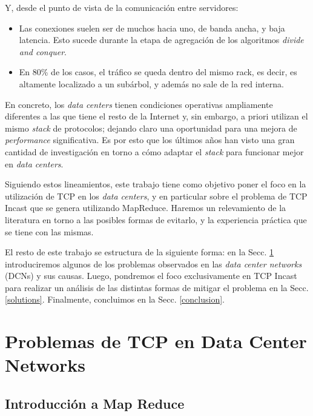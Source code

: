 \documentclass[runningheads,a4paper]{llncs}
\begin{document}
Y, desde el punto de vista de la comunicación entre servidores:

\begin{itemize}
    \item Las conexiones suelen ser de muchos hacia uno, de banda ancha, y baja latencia. Esto sucede durante la etapa de agregación de los algoritmos \textit{divide and conquer}.
    
    \item En 80\% de los casos, el tráfico se queda dentro del mismo rack, es decir, es altamente localizado a un subárbol, y además no sale de la red interna.
\end{itemize}

En concreto, los \textit{data centers} tienen condiciones operativas ampliamente diferentes a las que tiene el resto de la Internet y, sin embargo, a priori utilizan el mismo \textit{stack} de protocolos; dejando claro una oportunidad para una mejora de \textit{performance} significativa. Es por esto que los últimos años han visto una gran cantidad de investigación en torno a cómo adaptar el \textit{stack} para funcionar mejor en \textit{data centers}.

Siguiendo estos lineamientos, este trabajo tiene como objetivo poner el foco en la utilización de TCP en los \textit{data centers}, y en particular sobre el problema de TCP Incast que se genera utilizando MapReduce. Haremos un relevamiento de la literatura en torno a las posibles formas de evitarlo, y la experiencia práctica que se tiene con las mismas.

El resto de este trabajo se estructura de la siguiente forma: en la Secc. \ref{problems} introduciremos algunos de los problemas observados en las \textit{data center networks} (DCNs) y sus causas. Luego, pondremos el foco exclusivamente en TCP Incast para realizar un análisis de las distintas formas de mitigar el problema en la Secc. \ref{solutions}. Finalmente, concluimos en la Secc. \ref{conclusion}. 

\section{Problemas de TCP en Data Center Networks} \label{problems}

\subsection{Introducción a Map Reduce}
\end{document}
